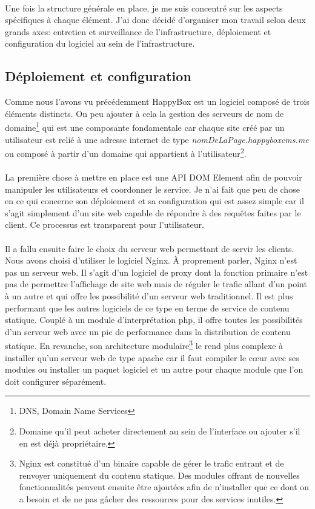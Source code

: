 \documentclass[11pt, a4paper ]{article}
\begin{document}
\begin{spacing}{1.5}
\paragraph{}
Une fois la structure générale en place, je me suis concentré sur les aspects spécifiques à chaque élément.
J'ai donc décidé d'organiser mon travail selon deux grands axes: entretien et surveillance de l’infrastructure, déploiement et configuration du logiciel au sein de l'infrastructure.

\subsection{Déploiement et configuration}

Comme nous l'avons vu précédemment HappyBox est un logiciel composé de trois éléments distincts. On peu ajouter à cela la gestion des serveurs de nom de domaine\footnote{DNS, Domain Name Services} qui est une composante fondamentale car chaque site créé par un utilisateur est relié à une adresse internet de type \emph{nomDeLaPage.happyboxcms.me} ou composé à partir d'un domaine qui appartient à l'utilisateur\footnote{Domaine qu'il peut acheter directement au sein de l'interface ou ajouter s'il en est déjà propriétaire.}.
\paragraph{}
La première chose à mettre en place est une API DOM Element afin de pouvoir manipuler les utilisateurs et coordonner le service. Je n'ai fait que peu de chose en ce qui concerne son déploiement et sa configuration qui est assez simple car il s'agit simplement d'un site web capable de répondre à des requêtes faites par le client. Ce processus est transparent pour l'utilisateur.
\paragraph{}
Il a fallu ensuite faire le choix du serveur web permettant de servir les clients. Nous avons choisi d'utiliser le logiciel Nginx. À proprement parler, Nginx n'est pas un serveur web. Il s'agit d'un logiciel de proxy dont la fonction primaire n'est pas de permettre l'affichage de site web mais de réguler le trafic allant d'un point à un autre et qui offre les possibilité d'un serveur web traditionnel. Il est plus performant que les autres logiciels de ce type en terme de service de contenu statique. Couplé à un module d’interprétation php, il offre toutes les possibilités d'un serveur web avec un pic de performance dans la distribution de contenu statique. En revanche, son architecture modulaire\footnote{Nginx est constitué d'un binaire capable de gérer le trafic entrant et de renvoyer uniquement du contenu statique. Des modules offrant de nouvelles fonctionnalités peuvent ensuite être ajoutées afin de n'installer que ce dont on a besoin et de ne pas gâcher des ressources pour des services inutiles.} le rend plus complexe à installer qu'un serveur web de type apache car il faut compiler le cœur avec ses modules ou installer un paquet logiciel et un autre pour chaque module que l'on doit configurer séparément.

\end{spacing}
\end{document}
